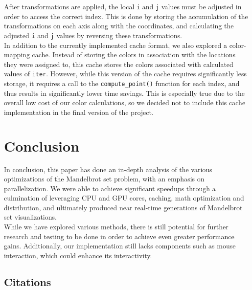 \documentclass{article}
\begin{document}
After transformations are applied, the local \verb|i| and \verb|j| values
must be adjusted in order to access the correct index.
This is done by storing the accumulation of the transformations on each 
axis along with the coordinates, and calculating the adjusted \verb|i| and
\verb|j| values by reversing these transformations.\\

In addition to the currently implemented cache format, we also explored a
color-mapping cache.
Instead of storing the colors in association with the locations they were 
assigned to, this cache stores the colors associated with calculated values
of \verb|iter|.
However, while this version of the cache requires significantly less 
storage, it requires a call to the \verb|compute_point()| function for each
index, and thus results in significantly lower time savings.
This is especially true due to the overall low cost of our color 
calculations, so we decided not to include this cache implementation in the
final version of the project.

\section{Conclusion}

In conclusion, this paper has done an in-depth analysis of the various 
optimizations of the Mandelbrot set problem, with an emphasis on 
parallelization.
We were able to achieve significant speedups through a culmination of 
leveraging CPU and GPU cores, caching, math optimization and distribution,
and ultimately produced near real-time generations of Mandelbrot set 
visualizations.\\

While we have explored various methods, there is still potential for 
further research and testing to be done in order to achieve even greater 
performance gains.
Additionally, our implementation still lacks components such as mouse 
interaction, which could enhance its interactivity.

\pagebreak

\begin{center}

\section*{Citations}

\end{center}
\end{document}
